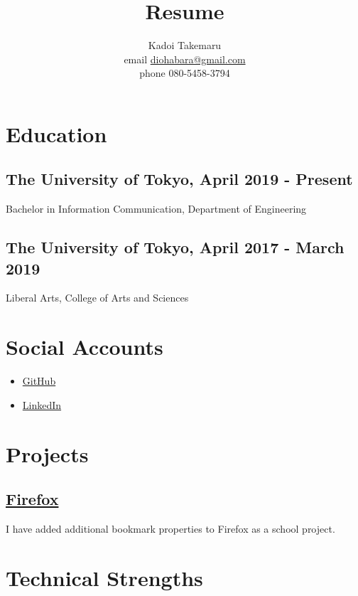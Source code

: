 \documentclass{article}
\title{Resume}
\author{Kadoi Takemaru \\ email \href{mailto:diohabara@gmail.com}{diohabara@gmail.com} \\ phone 080-5458-3794}
\begin{document}
\maketitle

\section*{Education}
  \subsection*{The University of Tokyo, April 2019 - Present}
    Bachelor in Information Communication, Department of Engineering
  \subsection*{The University of Tokyo, April 2017 - March 2019}
    Liberal Arts, College of Arts and Sciences

\section*{Social Accounts}
  \begin{itemize}
    \item \href{https://github.com/diohabara/}{GitHub}
    \item \href{https://www.linkedin.com/in/takemaru-kadoi-6950b5172/}{LinkedIn}
  \end{itemize}

\section*{Projects}
  \subsection*{\href{https://slides.com/diohabara/deck}{Firefox}}
    I have added additional bookmark properties to Firefox as a school project.


\section*{Technical Strengths}
\end{document}
